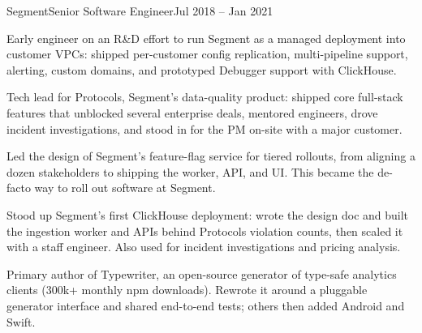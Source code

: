 \documentclass{resume}
\begin{document}
\begin{role}{Segment}{Senior Software Engineer}{Jul 2018 -- Jan 2021}
\item Early engineer on an R\&D effort to run Segment as a managed deployment into customer VPCs: shipped per-customer config replication, multi-pipeline support, alerting, custom domains, and prototyped Debugger support with ClickHouse.
\item Tech lead for Protocols, Segment’s data-quality product: shipped core full-stack features that unblocked several enterprise deals, mentored engineers, drove incident investigations, and stood in for the PM on-site with a major customer.
\item Led the design of Segment’s feature-flag service for tiered rollouts, from aligning a dozen stakeholders to shipping the worker, API, and UI. This became the de-facto way to roll out software at Segment.
\item Stood up Segment's first ClickHouse deployment: wrote the design doc and built the ingestion worker and APIs behind Protocols violation counts, then scaled it with a staff engineer. Also used for incident investigations and pricing analysis.
\item Primary author of Typewriter, an open-source generator of type-safe analytics clients (300k+ monthly npm downloads). Rewrote it around a pluggable generator interface and shared end-to-end tests; others then added Android and Swift.
\end{role}
\end{document}
